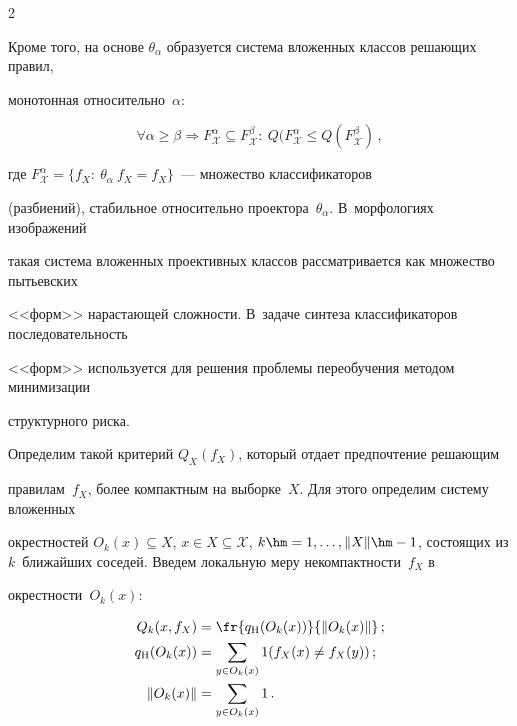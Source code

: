 \begin{multicols}{2}
\begin{equation*}

\end{equation*}

Кроме того, на основе $\theta_\alpha$ образуется система вложенных классов решающих правил, 

монотонная относительно~$\alpha$: 

\begin{equation*}

\forall \alpha \geq \beta \Rightarrow F^\alpha_{\mathcal{X}}\subseteq F^\beta_{\mathcal{X}}:\ 

Q(F^\alpha_{\mathcal{X}}\leq Q(F^\beta_{\mathcal{X}})\,,


\end{equation*}

где $F^\alpha_{\mathcal{X}}= \{ f_X:\ \theta_\alpha\ f_X=f_X\}$~--- множество классификаторов 

(разбиений), стабильное относительно проектора~$\theta_\alpha$. В~морфологиях изображений 

такая система вложенных проективных классов рас\-смат\-ри\-ва\-ет\-ся как множество пытьевских 

<<форм>> на\-рас\-та\-ющей сложности. В~задаче синтеза классификаторов последовательность 

<<форм>> используется для решения проблемы переобучения методом минимизации 

структурного риска.



Определим такой критерий $Q_X(f_X)$, который отдает предпочтение решающим 

правилам~$f_X$, более компактным на выборке~$X$. Для этого определим систему вложенных 

окрестностей $O_k(x)\subseteq X$, $x\in X\subseteq \mathcal{X}$, $k\hm=1, \ldots , \Vert X\Vert\hm-

1$, состоящих из $k$~ближайших соседей. Введем локальную меру некомпактности~$f_X$ в 

окрестности~$O_k(x)$:

\begin{align*}

Q_k(x, f_X) &= \fr{q_{\mathrm{H}}(O_k(x))}{\Vert O_k(x)\Vert}\,;\\

q_{\mathrm{H}}(O_k(x)) &= \sum\limits_{y\in O_k(x)} 1(f_X(x)\not= f_X(y))\,;\\

\Vert O_k(x)\Vert &= \sum\limits_{y\in O_k(x)} 1\,.


\end{align*}
\end{multicols}
